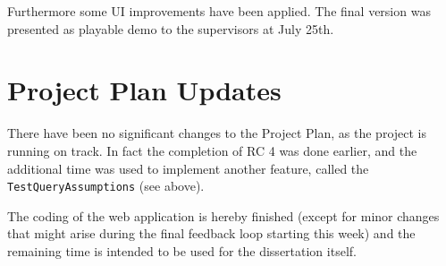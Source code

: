 \documentclass[11pt,twocolumn]{article}
\begin{document}
Furthermore some UI improvements have been applied. The final version was presented as playable demo to the supervisors at July 25th. 
\section{ Project Plan Updates}

There have been no significant changes to the Project Plan, as the project is running on track. In fact the completion of RC 4 was done earlier, and the additional time was used to implement another feature, called the \texttt{TestQueryAssumptions} (see above).

The coding of the web application is hereby finished (except for minor changes that might arise during the final feedback loop starting this week) and the remaining time is intended to be used for the dissertation itself. 


 
\end{document}

